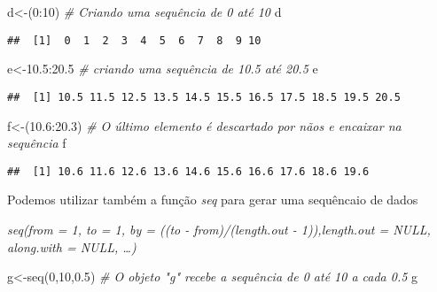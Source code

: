 \documentclass[
]{book}
\newenvironment{Shaded}{\begin{snugshade}}{\end{snugshade}}
\newcommand{\CommentTok}[1]{\textcolor[rgb]{0.56,0.35,0.01}{\textit{#1}}}
\newcommand{\DecValTok}[1]{\textcolor[rgb]{0.00,0.00,0.81}{#1}}
\newcommand{\FloatTok}[1]{\textcolor[rgb]{0.00,0.00,0.81}{#1}}
\newcommand{\FunctionTok}[1]{\textcolor[rgb]{0.00,0.00,0.00}{#1}}
\newcommand{\NormalTok}[1]{#1}
\newcommand{\OtherTok}[1]{\textcolor[rgb]{0.56,0.35,0.01}{#1}}
\newcommand{\SpecialCharTok}[1]{\textcolor[rgb]{0.00,0.00,0.00}{#1}}
\begin{document}
\begin{Shaded}
\begin{Highlighting}[]
\NormalTok{d}\OtherTok{\textless{}{-}}\NormalTok{(}\DecValTok{0}\SpecialCharTok{:}\DecValTok{10}\NormalTok{) }\CommentTok{\# Criando uma sequência de 0 até 10}
\NormalTok{d}
\end{Highlighting}
\end{Shaded}

\begin{verbatim}
##  [1]  0  1  2  3  4  5  6  7  8  9 10
\end{verbatim}

\begin{Shaded}
\begin{Highlighting}[]
\NormalTok{e}\OtherTok{\textless{}{-}}\FloatTok{10.5}\SpecialCharTok{:}\FloatTok{20.5} \CommentTok{\# criando uma sequência de 10.5 até 20.5}
\NormalTok{e}
\end{Highlighting}
\end{Shaded}

\begin{verbatim}
##  [1] 10.5 11.5 12.5 13.5 14.5 15.5 16.5 17.5 18.5 19.5 20.5
\end{verbatim}

\begin{Shaded}
\begin{Highlighting}[]
\NormalTok{f}\OtherTok{\textless{}{-}}\NormalTok{(}\FloatTok{10.6}\SpecialCharTok{:}\FloatTok{20.3}\NormalTok{) }\CommentTok{\# O último elemento é descartado por nãos e encaixar na sequência}
\NormalTok{f}
\end{Highlighting}
\end{Shaded}

\begin{verbatim}
##  [1] 10.6 11.6 12.6 13.6 14.6 15.6 16.6 17.6 18.6 19.6
\end{verbatim}

Podemos utilizar também a função \emph{seq} para gerar uma sequêncaio de dados

\emph{\emph{seq(from = 1, to = 1, by = ((to - from)/(length.out - 1)),length.out = NULL, along.with = NULL, \ldots)}}

\begin{Shaded}
\begin{Highlighting}[]
\NormalTok{g}\OtherTok{\textless{}{-}}\FunctionTok{seq}\NormalTok{(}\DecValTok{0}\NormalTok{,}\DecValTok{10}\NormalTok{,}\FloatTok{0.5}\NormalTok{) }\CommentTok{\# O objeto "g" recebe a sequência de 0 até 10 a cada 0.5}
\NormalTok{g}
\end{Highlighting}
\end{Shaded}
\end{document}
